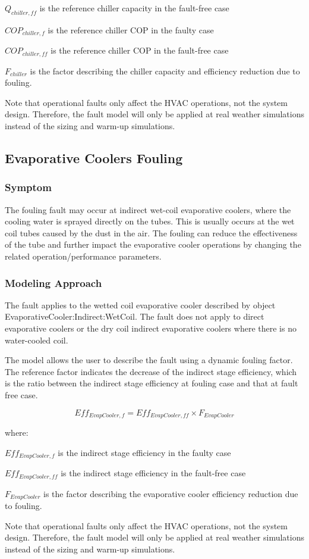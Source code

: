 \(Q_{chiller,ff}\) is the reference chiller capacity in the fault-free case

\(COP_{chiller,f}\) is the reference chiller COP in the faulty case

\(COP_{chiller,ff}\) is the reference chiller COP in the fault-free case

\(F_{chiller}\) is the factor describing the chiller capacity and efficiency reduction due to fouling.

Note that operational faults only affect the HVAC operations, not the system design. Therefore, the fault model will only be applied at real weather simulations instead of the sizing and warm-up simulations.


\subsection{Evaporative Coolers Fouling}\label{evaporative-cooler-fouling}

\subsubsection{Symptom}

The fouling fault may occur at indirect wet-coil evaporative coolers, where the cooling water is sprayed directly on the tubes. This is usually occurs at the wet coil tubes caused by the dust in the air. The fouling can reduce the effectiveness of the tube and further impact the evaporative cooler operations by changing the related operation/performance parameters.

\subsubsection{Modeling Approach}

The fault applies to the wetted coil evaporative cooler described by object EvaporativeCooler:Indirect:WetCoil. The fault does not apply to direct evaporative coolers or the dry coil indirect evaporative coolers where there is no water-cooled coil.

The model allows the user to describe the fault using a dynamic fouling factor. The reference factor indicates the decrease of the indirect stage efficiency, which is the ratio between the indirect stage efficiency at fouling case and that at fault free case.

\begin{equation}
Eff_{EvapCooler,f} = Eff_{EvapCooler,ff} \times F_{EvapCooler}
\end{equation}

where:

\(Eff_{EvapCooler,f}\) is the indirect stage efficiency in the faulty case

\(Eff_{EvapCooler,ff}\) is the indirect stage efficiency in the fault-free case

\(F_{EvapCooler}\) is the factor describing the evaporative cooler efficiency reduction due to fouling.

Note that operational faults only affect the HVAC operations, not the system design. Therefore, the fault model will only be applied at real weather simulations instead of the sizing and warm-up simulations.
